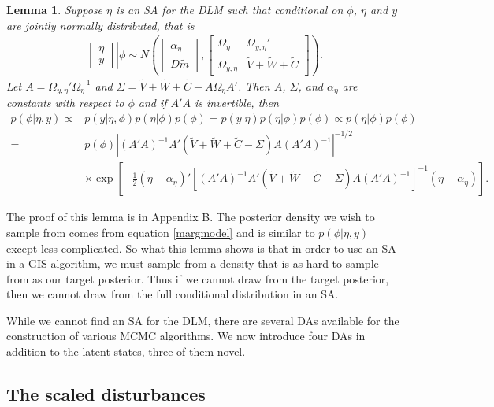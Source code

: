 \documentclass[12pt]{article}
\newtheorem{lem}{Lemma}
\begin{document}
\begin{lem}\label{noSA}
Suppose $\eta$ is an SA for the DLM such that conditional on $\phi$, $\eta$ and $y$ are jointly normally distributed, that is
\begin{align*}
 \left. \begin{bmatrix}\eta \\ y \end{bmatrix}\right|\phi \sim N\left(\begin{bmatrix} \alpha_\eta \\ D\tilde{m} \end{bmatrix}, \begin{bmatrix}
   \Omega_\eta & \Omega_{y,\eta}' \\
   \Omega_{y,\eta} & \tilde{V} + \tilde{W} + \tilde{C} \end{bmatrix}\right).
\end{align*}
Let $A=\Omega_{y,\eta}'\Omega_{\eta}^{-1}$ and $\Sigma = \tilde{V} + \tilde{W} + \tilde{C} - A\Omega_{\eta}A'$. Then $A$, $\Sigma$, and $\alpha_{\eta}$ are constants with respect to $\phi$ and if $A'A$ is invertible, then \vspace{-.3cm}
\begin{align*}
p(\phi|\eta,y) \propto& p(y|\eta,\phi)p(\eta|\phi)p(\phi) = p(y|\eta)p(\eta|\phi)p(\phi)  \propto p(\eta|\phi)p(\phi)  \\
=& p(\phi)|(A'A)^{-1}A'(\tilde{V} + \tilde{W} + \tilde{C} - \Sigma)A(A'A)^{-1}|^{-1/2}\\
&\times \exp\left[-\frac{1}{2}(\eta - \alpha_{\eta})'[(A'A)^{-1}A'(\tilde{V} + \tilde{W} + \tilde{C} - \Sigma)A(A'A)^{-1}]^{-1}(\eta - \alpha_{\eta})\right].
\end{align*}
\end{lem}
\noindent The proof of this lemma is in Appendix B. The posterior density we wish to sample from comes from equation \eqref{margmodel} and is similar to $p(\phi|\eta,y)$ except less complicated. So what this lemma shows is that in order to use an SA in a GIS algorithm, we must sample from a density that is as hard to sample from as our target posterior. Thus if we cannot draw from the target posterior, then we cannot draw from the full conditional distribution in an SA.

While we cannot find an SA for the DLM, there are several DAs available for the construction of various MCMC algorithms. We now introduce four DAs in addition to the latent states, three of them novel.

\subsection{The scaled disturbances}\label{sec:DAs:dist}
\end{document}
